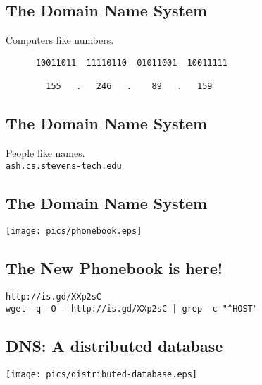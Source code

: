 \documentclass[xga]{xdvislides}
\begin{document}
\subsection{The Domain Name System}
\vspace{.5in}
\begin{center}
	\Huge
	Computers like numbers. \\
\vspace{.5in}
\begin{verbatim}
      10011011  11110110  01011001  10011111

        155   .   246   .    89   .   159
\end{verbatim}
\end{center}
\Normalsize

\subsection{The Domain Name System}
\vspace{.5in}
\begin{center}
	\Huge
	People like names. \\
\vspace{.5in}
\verb+ash.cs.stevens-tech.edu+
\end{center}
\Normalsize


\subsection{The Domain Name System}
\vspace*{\fill}
\begin{center}
	\texttt{[image: pics/phonebook.eps]}
\end{center}
\vspace*{\fill}

\subsection{The New Phonebook is here!}
\vspace*{\fill}
\begin{center}
	\verb+http://is.gd/XXp2sC+ \\
	\addvspace{.5in}
	\verb+wget -q -O - http://is.gd/XXp2sC | grep -c "^HOST"+
\end{center}
\vspace*{\fill}

\subsection{DNS: A distributed database}
\vspace*{\fill}
\begin{center}
	\texttt{[image: pics/distributed-database.eps]}
\end{center}
\vspace*{\fill}
\end{document}

